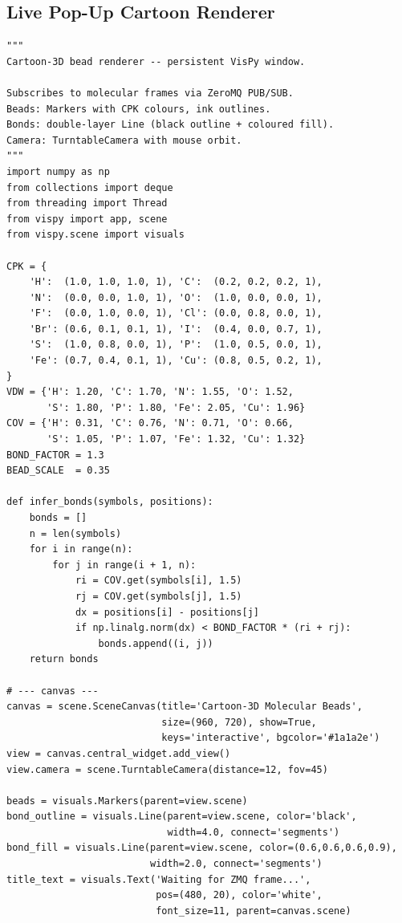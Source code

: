 \documentclass[11pt,a4paper]{article}
\begin{document}
\subsection{Live Pop-Up Cartoon Renderer}

\begin{lstlisting}[title={\textbf{Full live cartoon-3D molecular renderer}}]
"""
Cartoon-3D bead renderer -- persistent VisPy window.

Subscribes to molecular frames via ZeroMQ PUB/SUB.
Beads: Markers with CPK colours, ink outlines.
Bonds: double-layer Line (black outline + coloured fill).
Camera: TurntableCamera with mouse orbit.
"""
import numpy as np
from collections import deque
from threading import Thread
from vispy import app, scene
from vispy.scene import visuals

CPK = {
    'H':  (1.0, 1.0, 1.0, 1), 'C':  (0.2, 0.2, 0.2, 1),
    'N':  (0.0, 0.0, 1.0, 1), 'O':  (1.0, 0.0, 0.0, 1),
    'F':  (0.0, 1.0, 0.0, 1), 'Cl': (0.0, 0.8, 0.0, 1),
    'Br': (0.6, 0.1, 0.1, 1), 'I':  (0.4, 0.0, 0.7, 1),
    'S':  (1.0, 0.8, 0.0, 1), 'P':  (1.0, 0.5, 0.0, 1),
    'Fe': (0.7, 0.4, 0.1, 1), 'Cu': (0.8, 0.5, 0.2, 1),
}
VDW = {'H': 1.20, 'C': 1.70, 'N': 1.55, 'O': 1.52,
       'S': 1.80, 'P': 1.80, 'Fe': 2.05, 'Cu': 1.96}
COV = {'H': 0.31, 'C': 0.76, 'N': 0.71, 'O': 0.66,
       'S': 1.05, 'P': 1.07, 'Fe': 1.32, 'Cu': 1.32}
BOND_FACTOR = 1.3
BEAD_SCALE  = 0.35

def infer_bonds(symbols, positions):
    bonds = []
    n = len(symbols)
    for i in range(n):
        for j in range(i + 1, n):
            ri = COV.get(symbols[i], 1.5)
            rj = COV.get(symbols[j], 1.5)
            dx = positions[i] - positions[j]
            if np.linalg.norm(dx) < BOND_FACTOR * (ri + rj):
                bonds.append((i, j))
    return bonds

# --- canvas ---
canvas = scene.SceneCanvas(title='Cartoon-3D Molecular Beads',
                           size=(960, 720), show=True,
                           keys='interactive', bgcolor='#1a1a2e')
view = canvas.central_widget.add_view()
view.camera = scene.TurntableCamera(distance=12, fov=45)

beads = visuals.Markers(parent=view.scene)
bond_outline = visuals.Line(parent=view.scene, color='black',
                            width=4.0, connect='segments')
bond_fill = visuals.Line(parent=view.scene, color=(0.6,0.6,0.6,0.9),
                         width=2.0, connect='segments')
title_text = visuals.Text('Waiting for ZMQ frame...',
                          pos=(480, 20), color='white',
                          font_size=11, parent=canvas.scene)


\end{lstlisting}
\end{document}

